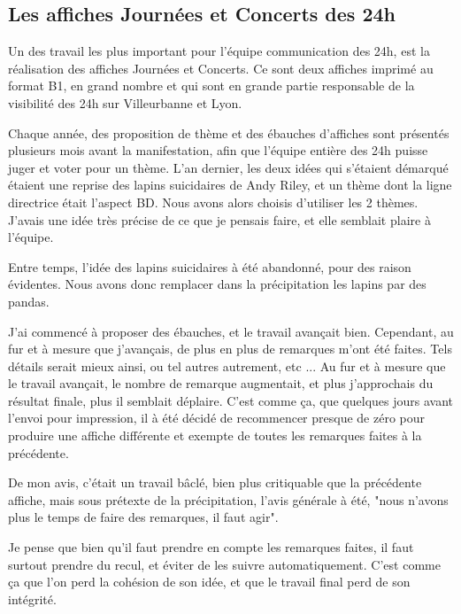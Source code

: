     \subsection{Les affiches Journées et Concerts des 24h}
        
        Un des travail les plus important pour l'équipe communication des 24h, est la réalisation des affiches Journées et Concerts.
        Ce sont deux affiches imprimé au format B1, en grand nombre et qui sont en grande partie responsable de la visibilité des 24h sur Villeurbanne et Lyon.
        
        Chaque année, des proposition de thème et des ébauches d'affiches sont présentés plusieurs mois avant la manifestation, afin que l'équipe entière des 24h puisse juger et voter pour un thème.
        L'an dernier, les deux idées qui s'étaient démarqué étaient une reprise des lapins suicidaires de Andy Riley, et un thème dont la ligne directrice était l'aspect BD.
        Nous avons alors choisis d'utiliser les 2 thèmes.
        J'avais une idée très précise de ce que je pensais faire, et elle semblait plaire à l'équipe.
        
        Entre temps, l'idée des lapins suicidaires à été abandonné, pour des raison évidentes.
        Nous avons donc remplacer dans la précipitation les lapins par des pandas.
        
        J'ai commencé à proposer des ébauches, et le travail avançait bien.
        Cependant, au fur et à mesure que j'avançais, de plus en plus de remarques m'ont été faites. Tels détails serait mieux ainsi, ou tel autres autrement, etc ...
        Au fur et à mesure que le travail avançait, le nombre de remarque augmentait, et plus j'approchais du résultat finale, plus il semblait déplaire.
        C'est comme ça, que quelques jours avant l'envoi pour impression, il à été décidé de recommencer presque de zéro pour produire une affiche différente et exempte de toutes les remarques faites à la précédente.
        
        De mon avis, c'était un travail bâclé, bien plus critiquable que la précédente affiche, mais sous prétexte de la précipitation, l'avis générale à été, "nous n'avons plus le temps de faire des remarques, il faut agir".
        
        Je pense que bien qu'il faut prendre en compte les remarques faites, il faut surtout prendre du recul, et éviter de les suivre automatiquement. C'est comme ça que l'on perd la cohésion de son idée, et que le travail final perd de son intégrité.
        
